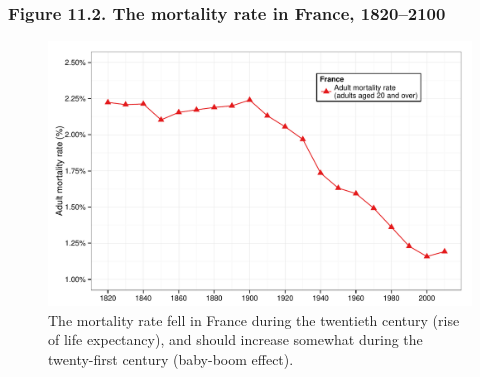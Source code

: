 \documentclass[t]{beamer}\usepackage[]{graphicx}\usepackage[]{color}
\newenvironment{knitrout}{}{} %
\begin{document}
\begin{frame}[label=Figure_11_2]
\frametitle{Figure 11.2. The mortality rate in France, 1820--2100}
\begin{figure}[t]
\begin{minipage}[b]{\textwidth}
\centering
\begin{knitrout}\footnotesize
{}\color{fgcolor}

{\centering \includegraphics[width=1\linewidth]{figures/color/Figure_11_2} 

}



\end{knitrout}
\caption{The mortality rate fell in France during the twentieth century (rise of life expectancy), and should increase somewhat during the twenty-first century (baby-boom effect).}
\end{minipage}
\end{figure}
\end{frame}
\end{document}
